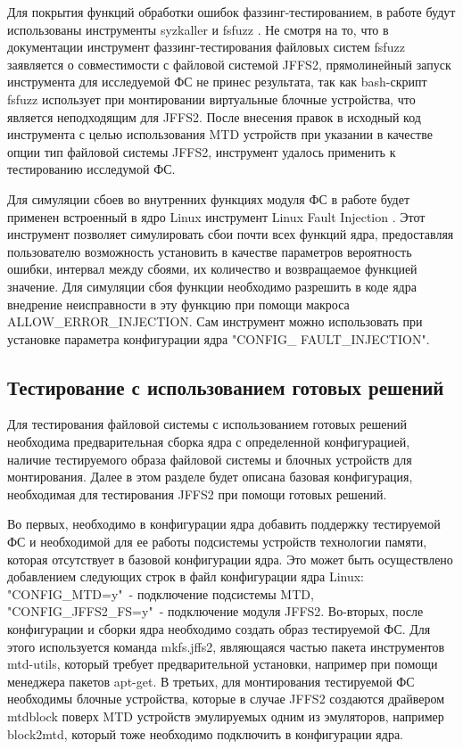 Для покрытия функций обработки ошибок фаззинг-тестированием, в работе будут использованы инструменты syzkaller \cite{syzkaller} и fsfuzz \cite{fsfuzz}. Не смотря на то, что в документации инструмент фаззинг-тестирования файловых систем fsfuzz заявляется о совместимости с файловой системой JFFS2, прямолинейный запуск инструмента для исследуемой ФС не принес результата, так как bash-скрипт fsfuzz использует при монтировании виртуальные блочные устройства, что является неподходящим для JFFS2. После внесения правок в исходный код инструмента с целью использования MTD устройств при указании в качестве опции тип файловой системы JFFS2, инструмент удалось применить к тестированию исследумой ФС.

Для симуляции сбоев во внутренних функциях модуля ФС в работе будет применен встроенный в ядро Linux инструмент Linux Fault Injection \cite{fault}. Этот инструмент позволяет симулировать сбои почти всех функций ядра, предоставляя пользователю возможность установить в качестве параметров вероятность ошибки, интервал между сбоями, их количество и возвращаемое функцией значение. Для симуляции сбоя функции необходимо разрешить в коде ядра внедрение неисправности в эту функцию при помощи макроса ALLOW\_ERROR\_INJECTION. Сам инструмент можно использовать при установке параметра конфигурации ядра "CONFIG\_ FAULT\_INJECTION".

\subsection{Тестирование с использованием готовых решений}

Для тестирования файловой системы с использованием готовых решений необходима предварительная сборка ядра с определенной конфигурацией, наличие тестируемого образа файловой системы и блочных устройств для монтирования. Далее в этом разделе будет описана базовая конфигурация, необходимая для тестирования JFFS2 при помощи готовых решений.

Во первых, необходимо в конфигурации ядра добавить поддержку тестируемой ФС и необходимой для ее работы подсистемы устройств технологии памяти, которая отсутствует в базовой конфигурации ядра. Это может быть осуществлено добавлением следующих строк в файл конфигурации ядра Linux: "CONFIG\_MTD=y"\ - подключение подсистемы MTD, "CONFIG\_JFFS2\_FS=y"\ - подключение модуля JFFS2. Во-вторых, после конфигурации и сборки ядра необходимо создать образ тестируемой ФС. Для этого используется команда mkfs.jffs2, являющаяся частью пакета инструментов mtd-utils, который требует предварительной установки, например при помощи менеджера пакетов apt-get. В третьих, для монтирования тестируемой ФС необходимы блочные устройства, которые в случае JFFS2 создаются драйвером mtdblock поверх MTD устройств эмулируемых одним из эмуляторов, например block2mtd, который тоже необходимо подключить в конфигурации ядра.

